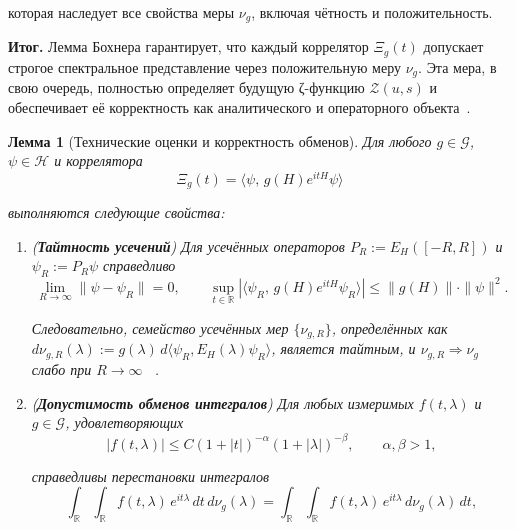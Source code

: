 \documentclass{article}
\numberwithin{equation}{section}
\theoremstyle{plain}
\newtheorem{lemma}{Лемма}
\theoremstyle{definition}
\theoremstyle{remark}
\def\Rightarrow{⇒}%
\def\alpha{α}\def\beta{β}\def\gamma{γ}\def\Gamma{Γ}%
\def\infty{∞}\def\partial{∂}\def\sum{Σ}\def\int{∫}%
\def\cdot{·}\def\times{×}\def\pm{±}\def\mp{∓}\def\approx{≈}%
\begin{document}
которая наследует все свойства меры $\nu_g$, включая чётность и положительность.

\bigskip
\noindent
\textbf{Итог.}  
Лемма Бохнера гарантирует, что каждый коррелятор $\Xi_g(t)$ допускает строгое спектральное представление через положительную меру $\nu_g$.  
Эта мера, в свою очередь, полностью определяет будущую ζ-функцию $\mathcal Z(u,s)$ и обеспечивает её корректность как аналитического и операторного объекта~\cite{Connes1994}.


\begin{lemma}[Технические оценки и корректность обменов]
\label{lem:technical}
Для любого $g\in\mathcal G$, $\psi\in\mathcal H$ и коррелятора
\begin{equation}
\Xi_g(t)=\langle\psi,\,g(H)e^{itH}\psi\rangle
\label{eq:QSSC0016}
\end{equation}

выполняются следующие свойства:

\begin{enumerate}[label=(\roman*), leftmargin=2.3em]
  \item (\textbf{Тайтность усечений})  
  Для усечённых операторов $P_R:=E_H([-R,R])$ и $\psi_R:=P_R\psi$ справедливо
\begin{equation}
  \lim_{R\to\infty}\|\psi-\psi_R\|=0,
  \qquad
  \sup_{t\in\mathbb R}|\langle\psi_R,\,g(H)e^{itH}\psi_R\rangle|
  \le \|g(H)\|\cdot\|\psi\|^2.
\label{eq:QSSC0017}
\end{equation}

  Следовательно, семейство усечённых мер 
  $\{\nu_{g,R}\}$, определённых как 
  $d\nu_{g,R}(\lambda):=g(\lambda)\,d\langle\psi_R,E_H(\lambda)\psi_R\rangle$, 
  является тайтным, и $\nu_{g,R}\Rightarrow\nu_g$ слабо при $R\to\infty$ ~\cite{Billingsley1999}.

  \item (\textbf{Допустимость обменов интегралов})  
  Для любых измеримых $f(t,\lambda)$ и $g\in\mathcal G$, удовлетворяющих
\begin{equation}
  |f(t,\lambda)|\le C(1+|t|)^{-\alpha}(1+|\lambda|)^{-\beta},
  \qquad \alpha,\beta>1,
\label{eq:QSSC0018}
\end{equation}

  справедливы перестановки интегралов
\begin{equation}
  \int_{\mathbb R}\!\!\int_{\mathbb R} 
  f(t,\lambda)\,e^{it\lambda}\,dt\,d\nu_g(\lambda)
  =\int_{\mathbb R}\!\!\int_{\mathbb R}
  f(t,\lambda)\,e^{it\lambda}\,d\nu_g(\lambda)\,dt,
\label{eq:QSSC0019}
\end{equation}


\end{enumerate}
\end{lemma}
\end{document}
